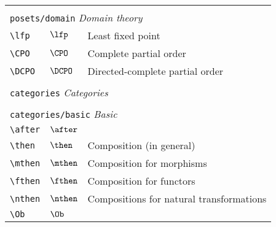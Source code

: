 \begin{longtable}{lll}
  &                            &                                                         \\
  \multicolumn{3}{l}{{\color[rgb]{0.5,0.5,0.5}\texttt{posets/domain}} \emph{Domain theory}}
  \\
  \hline
  {\color[rgb]{0.5,0.5,0.5}\texttt{\textbackslash lfp}}                                                     & $\lfp$                     & Least fixed point\\
  {\color[rgb]{0.5,0.5,0.5}\texttt{\textbackslash CPO}}                                                     & $\CPO$                     & Complete partial order\\
  {\color[rgb]{0.5,0.5,0.5}\texttt{\textbackslash DCPO}}                                                    & $\DCPO$                    & Directed-complete partial order                         \\
  &                            &                                                         \\
  \multicolumn{3}{l}{{\color[rgb]{0.5,0.5,0.5}\texttt{categories}} \emph{Categories}}
  \\
  \hline
  \hline
  &                            &                                                         \\
  \multicolumn{3}{l}{{\color[rgb]{0.5,0.5,0.5}\texttt{categories/basic}} \emph{Basic}}
  \\
  \hline
  {\color[rgb]{0.5,0.5,0.5}\texttt{\textbackslash after}}                                                   & $\after$                   & \\
  {\color[rgb]{0.5,0.5,0.5}\texttt{\textbackslash then}}                                                    & $\then$                    & Composition (in general)\\
  {\color[rgb]{0.5,0.5,0.5}\texttt{\textbackslash mthen}}                                                   & $\mthen$                   & Composition for morphisms\\
  {\color[rgb]{0.5,0.5,0.5}\texttt{\textbackslash fthen}}                                                   & $\fthen$                   & Composition for functors\\
  {\color[rgb]{0.5,0.5,0.5}\texttt{\textbackslash nthen}}                                                   & $\nthen$                   & Compositions for natural transformations\\
  {\color[rgb]{0.5,0.5,0.5}\texttt{\textbackslash Ob}}                                                      & $\Ob$                      & \\

\end{longtable}
